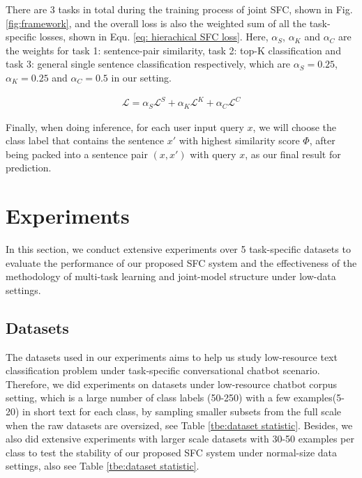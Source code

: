 \documentclass[letterpaper]{article} %
\begin{document}
  There  are  3  tasks in total during the training process of joint SFC,
  shown  in  Fig. \ref{fig:framework}, and the overall loss is also the weighted
  sum  of  all  the task-specific losses, shown in Equ. \ref{eq: hierachical SFC
  loss}. Here, $\alpha_S$, $\alpha_K$ and $\alpha_C$ are the weights for task 1:
  sentence-pair  similarity,  task  2:  top-K classification and task 3: general
  single   sentence  classification  respectively,  which  are  $\alpha_S=0.25$,
  $\alpha_K=0.25$ and $\alpha_C=0.5$ in our setting.

  \begin{align}
    \mathcal{L} = \alpha_S \mathcal{L}^S + \alpha_K \mathcal{L}^K + \alpha_C \mathcal{L}^C
    \label{eq: hierachical SFC loss}
  \end{align}

  Finally,  when  doing inference, for each user input query $x$, we will choose
  the  class label that contains the sentence $x'$ with highest similarity score
  $\varPhi$,  after  being packed into a sentence pair $(x, x')$ with query $x$,
  as our final result for prediction.

  \section{Experiments}
  \label{sec:exp}
  
  In  this  section,  we  conduct  extensive  experiments  over  5 task-specific
  datasets  to  evaluate  the  performance  of  our  proposed SFC system and the
  effectiveness  of  the  methodology  of  multi-task  learning  and
  joint-model structure under low-data settings.

  \subsection{Datasets}
  The  datasets  used in our experiments aims to help us study low-resource text
  classification  problem  under  task-specific conversational chatbot scenario.
  Therefore,  we did experiments on datasets under low-resource chatbot corpus setting,
  which  is a large number of class labels (50-250) with a few examples(5-20) in
  short  text  for  each  class, by sampling smaller subsets from the full scale
  when the raw datasets are oversized, see Table \ref{tbe:dataset statistic}. Besides, we also did extensive experiments with larger scale datasets with 30-50 examples per class to test the stability of our proposed SFC system under normal-size data settings, also see Table \ref{tbe:dataset statistic}.
\end{document}
